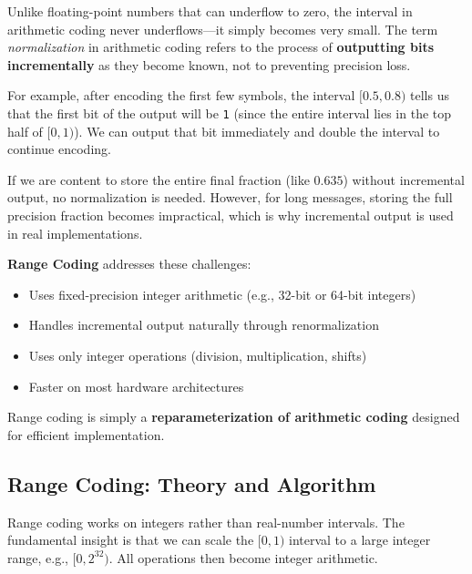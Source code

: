 \documentclass[12pt]{article}
\begin{document}
\begin{tcolorbox}[colback=yellow!5,colframe=orange!70!black,title=Normalization in Arithmetic Coding]
Unlike floating-point numbers that can underflow to zero, the interval in arithmetic coding never underflows—it simply becomes very small. The term \textit{normalization} in arithmetic coding refers to the process of \textbf{outputting bits incrementally} as they become known, not to preventing precision loss. 

For example, after encoding the first few symbols, the interval $[0.5, 0.8)$ tells us that the first bit of the output will be \texttt{1} (since the entire interval lies in the top half of $[0,1)$). We can output that bit immediately and double the interval to continue encoding.

If we are content to store the entire final fraction (like $0.635$) without incremental output, no normalization is needed. However, for long messages, storing the full precision fraction becomes impractical, which is why incremental output is used in real implementations.
\end{tcolorbox}

\textbf{Range Coding} addresses these challenges:
\begin{itemize}
    \item Uses fixed-precision integer arithmetic (e.g., 32-bit or 64-bit integers)
    \item Handles incremental output naturally through renormalization
    \item Uses only integer operations (division, multiplication, shifts)
    \item Faster on most hardware architectures
\end{itemize}

Range coding is simply a \textbf{reparameterization of arithmetic coding} designed for efficient implementation.

\subsection{Range Coding: Theory and Algorithm}

Range coding works on integers rather than real-number intervals. The fundamental insight is that we can scale the $[0,1)$ interval to a large integer range, e.g., $[0, 2^{32})$. All operations then become integer arithmetic.
\end{document}
